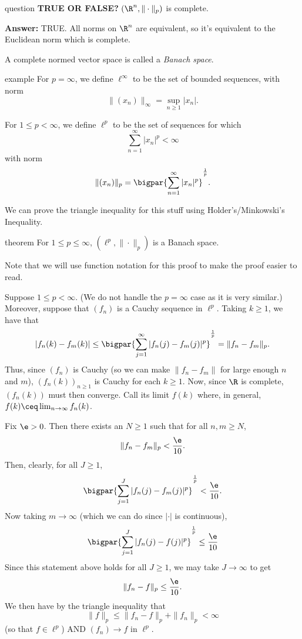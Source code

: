 \documentclass[class=article, crop=false]{standalone}
\begin{document}
\begin{understandingcheck}{question}
  \textbf{TRUE OR FALSE?} $(\R^n, \|\cdot\|_p)$ is complete.

  \textbf{Answer:} TRUE. All norms on $\R^n$ are equivalent, so it's equivalent to the Euclidean norm which is complete.
\end{understandingcheck}

\begin{defn}
  A complete normed vector space is called a \emph{Banach space}.
\end{defn}

\begin{understandingcheck}{example}
  For $p=\infty$, we define $\ell^\infty$ to be the set of bounded sequences, with norm
    \[
      \|(x_n)\|_\infty = \sup_{n \geq 1}|x_n|.
    \]

  For $1 \leq p <\infty$, we define $\ell^p$ to be the set of sequences for which
    \[
      \sum_{n=1}^{\infty} |x_n|^p <\infty
    \]
  with norm
    \[
      \|(x_n)\|_p = \bigpar{\sum_{n=1}^{\infty} |x_n|^p}^{\frac{1}{p}}.
    \]

  We can prove the triangle inequality for this stuff using Holder's/Minkowski's Inequality.
\end{understandingcheck}

\begin{result}{theorem}
  For $1 \leq p \leq \infty$, $(\ell^p, \|\cdot\|_p)$ is a Banach space.
\end{result}
\begin{pf}
  Note that we will use function notation for this proof to make the proof easier to read.

  Suppose $1 \leq p < \infty$. (We do not handle the $p=\infty$ case as it is very similar.) Moreover, suppose that $(f_n)$ is a Cauchy sequence in $\ell^p$. Taking $k \geq 1$, we have that
    \[
      |f_n(k) - f_m(k)| \leq \bigpar{\sum_{j=1}^{\infty} |f_n(j)-f_m(j)|^p}^{\frac{1}{p}} = \|f_n-f_m\|_p.
    \]
  Thus, since $(f_n)$ is Cauchy (so we can make $\|f_n-f_m\|$ for large enough $n$ and $m$), $(f_n(k))_{n \geq 1}$ is Cauchy for each $k \geq 1$. Now, since $\R$ is complete, $(f_n(k))$ must then converge. Call its limit $f(k)$ where, in general, $f(k) \ceq \lim_{n \to \infty} f_n(k)$.

  Fix $\e > 0$. Then there exists an $N \geq 1$ such that for all $n,m \geq N$,
    \[
      \|f_n-f_m\|_p < \frac{\e}{10}.
    \]
  Then, clearly, for all $J \geq 1$,
    \[
      \bigpar{\sum_{j=1}^{J} |f_n(j)-f_m(j)|^p}^{\frac{1}{p}} < \frac{\e}{10}.
    \]
  Now taking $m \to \infty$ (which we can do since $|\cdot|$ is continuous),
    \[
      \bigpar{\sum_{j=1}^{J} |f_n(j)-f(j)|^p}^{\frac{1}{p}} \leq \frac{\e}{10}
    \]
  Since this statement above holds for all $J \geq 1$, we may take $J \to \infty$ to get
    \[
      \|f_n-f\|_p \leq \frac{\e}{10}.
    \]
  We then have by the triangle inequality that
    \[
      \|f\|_p \leq \|f_n-f\|_p + \|f_n\|_p < \infty
    \]
  (so that $f \in \ell^p$) AND $(f_n) \to f$ in $\ell^p$.
\end{pf}
\end{document}

